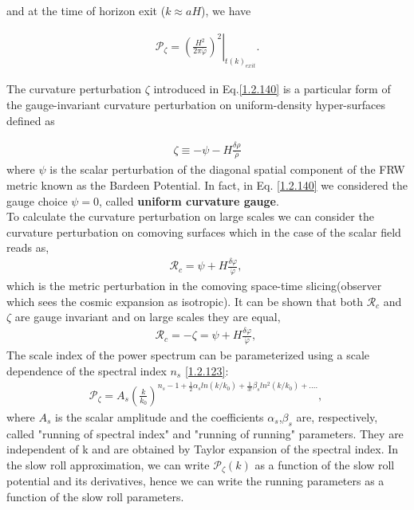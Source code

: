 and at the time of horizon exit ($k \approx aH$), we have



\begin{align}
    \mathcal{P}_{\zeta}=\left.\left(\frac{H^2}{2 \pi \dot{\varphi}}\right)^{2}\right|_{t(k)_{exit }} .\label{1.2.144}
\end{align}

The curvature perturbation $\zeta$ introduced in Eq.\eqref{1.2.140} is a particular form of the gauge-invariant curvature perturbation on uniform-density hyper-surfaces defined as

\begin{align}
    \zeta \equiv-\psi-H \frac{\delta \rho}{\dot{\rho}} \label{1.2.145}
\end{align}
where $\psi$ is the scalar perturbation of the diagonal spatial component of the FRW metric known as the Bardeen Potential. In fact, in Eq. \eqref{1.2.140} we considered the gauge choice $\psi=0$, called \textbf{uniform curvature gauge}.\\
To calculate the curvature perturbation on large scales we can consider the curvature perturbation on comoving surfaces which in the case of the scalar field reads as,
\begin{align}
    \mathcal{R}_c = \psi + H \frac{\delta \varphi}{\dot{\varphi}},\ \label{1.2.146}
\end{align}
which is the metric perturbation in the comoving space-time slicing(observer which sees the cosmic expansion as isotropic). It can be shown that both $\mathcal{R}_c$ and $\zeta$
are gauge invariant and on large scales they are equal,
\begin{align}
    \mathcal{R}_c = -\zeta = \psi + H \frac{\delta \varphi}{\dot{\varphi}},\ \label{1.2.147}
\end{align}
The scale index of the power spectrum can be parameterized using a scale dependence of the spectral index $n_s$ \eqref{1.2.123}:
\begin{align}
    \mathcal{P}_{\zeta}  = A_s (\frac{k}{k_0})^{n_s -1 + \frac{1}{2}\alpha_{s} ln(k/k_0)+ \frac{1}{3!}\beta_{s}ln^2(k/k_0) + ....},\ \label{1.2.148}
\end{align}
where $A_{s}$ is the scalar amplitude and the coefficients $\alpha_{s}$,$\beta_{s}$ are, respectively, called "running of spectral index" and "running of running"
parameters. They are independent of k and are obtained by Taylor expansion of the spectral index. In the slow roll approximation, we can write $\mathcal{P}_{\zeta}(k)$ as a function of the slow roll potential and its derivatives, hence we can write the running parameters as a function of the slow roll parameters\cite{baumann2012tasi}.\\
